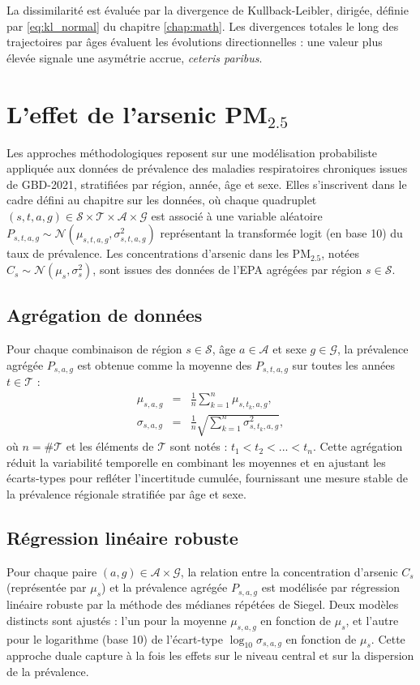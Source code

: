 La dissimilarité est évaluée par la divergence de Kullback-Leibler, dirigée, définie par \eqref{eq:kl_normal} du chapitre \ref{chap:math}. Les divergences totales le long des trajectoires par âges évaluent les évolutions directionnelles : une valeur plus élevée signale une asymétrie accrue, \emph{ceteris paribus}.

\section{L'effet de l'arsenic PM$_{2.5}$}
Les approches méthodologiques reposent sur une modélisation probabiliste appliquée aux données de prévalence des maladies respiratoires chroniques issues de GBD-2021, stratifiées par région, année, âge et sexe. Elles s'inscrivent dans le cadre défini au chapitre sur les données, où chaque quadruplet $(s, t, a, g) \in \mathcal{S} \times \mathcal{T} \times \mathcal{A} \times \mathcal{G}$ est associé à une variable aléatoire $P_{s,t,a,g} \sim \mathcal{N}(\mu_{s,t,a,g}, \sigma_{s,t,a,g}^2)$ représentant la transformée logit (en base 10) du taux de prévalence. Les concentrations d'arsenic dans les PM$_{2.5}$, notées $C_s \sim \mathcal{N}(\mu_s, \sigma_s^2)$, sont issues des données de l'EPA agrégées par région $s \in \mathcal{S}$.

\subsection{Agrégation de données}
Pour chaque combinaison de région $s \in \mathcal{S}$, âge $a \in \mathcal{A}$ et sexe $g \in \mathcal{G}$, la prévalence agrégée $P_{s,a,g}$ est obtenue comme la moyenne des $P_{s,t,a,g}$ sur toutes les années $t \in \mathcal{T}$ :
\begin{eqnarray}
\mu_{s,a,g} &=& \frac{1}{n} \sum_{k=1}^n \mu_{s,t_k,a,g}, \\
\sigma_{s,a,g} &=& \frac{1}{n} \sqrt{\sum_{k=1}^n \sigma_{s,t_k,a,g}^2},
\end{eqnarray}
où $n = \#\mathcal{T}$ et les éléments de $\mathcal{T}$ sont notés : $t_1 < t_2 < ... < t_n$. Cette agrégation réduit la variabilité temporelle en combinant les moyennes et en ajustant les écarts-types pour refléter l'incertitude cumulée, fournissant une mesure stable de la prévalence régionale stratifiée par âge et sexe.

\subsection{Régression linéaire robuste}
Pour chaque paire $(a, g) \in \mathcal{A} \times \mathcal{G}$, la relation entre la concentration d'arsenic $C_s$ (représentée par $\mu_s$) et la prévalence agrégée $P_{s,a,g}$ est modélisée par régression linéaire robuste par la méthode des médianes répétées de Siegel. Deux modèles distincts sont ajustés : l'un pour la moyenne $\mu_{s,a,g}$ en fonction de $\mu_s$, et l'autre pour le logarithme (base 10) de l'écart-type $\log_{10} \sigma_{s,a,g}$ en fonction de $\mu_s$. Cette approche duale capture à la fois les effets sur le niveau central et sur la dispersion de la prévalence.

